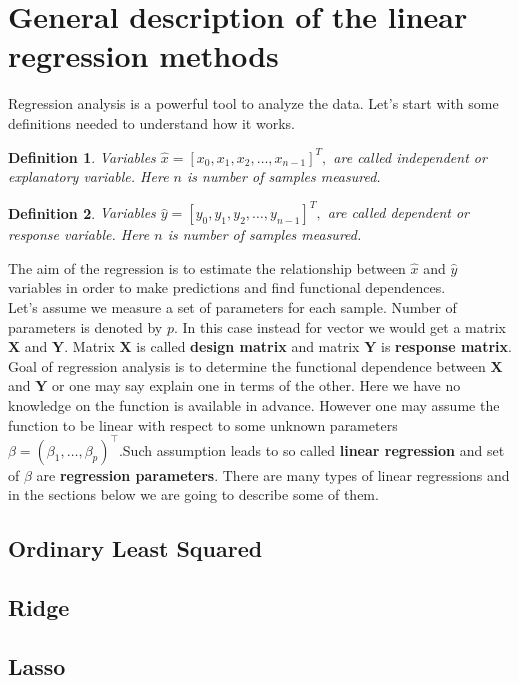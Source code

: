 \documentclass[10pt]{article}
\newtheorem{defn}{Definition}
\begin{document}
\section{General description of the linear regression methods} \label{Theory}
Regression analysis is a powerful tool to analyze the data. Let's start with some definitions needed to understand how it works.
\begin{defn}
Variables $\hat{x} = [x_0,x_1, x_2,\dots, x_{n-1}]^T,$ are called independent  or explanatory variable. Here $n$ is number of samples measured.
\end{defn}

\begin{defn}
	Variables  $\hat{y} = [y_0,y_1, y_2,\dots, y_{n-1}]^T,$ are called dependent or response variable. Here $n$ is number of samples measured.
\end{defn}
The aim of the regression is to estimate the relationship between $\hat{x}$ and $\hat{y}$ variables in order to make predictions and find functional dependences. \\
Let's assume we measure a set of parameters for each sample. Number of parameters is denoted by $p$. In this case instead for vector we would get a matrix $\textbf{X}$ and $\textbf{Y}$. Matrix $\textbf{X}$ is called \textbf{design matrix} and matrix $\textbf{Y}$ is \textbf{response matrix}. Goal of regression analysis is to determine the functional dependence between $\textbf{X}$ and $\textbf{Y}$ or one may say explain one in terms of the other. Here we have no knowledge on the function is available in advance. However one may assume the function to be linear with respect to some unknown parameters $\beta = (\beta_1, \ldots, \beta_p)^{\top}$.Such assumption leads to so called \textbf{linear regression} and set of $\beta$  are \textbf{regression parameters}. There are many types of linear regressions and in the sections below we are going to describe some of them.
\subsection{Ordinary Least Squared}

\subsection{Ridge}

\subsection{Lasso}
\end{document}
